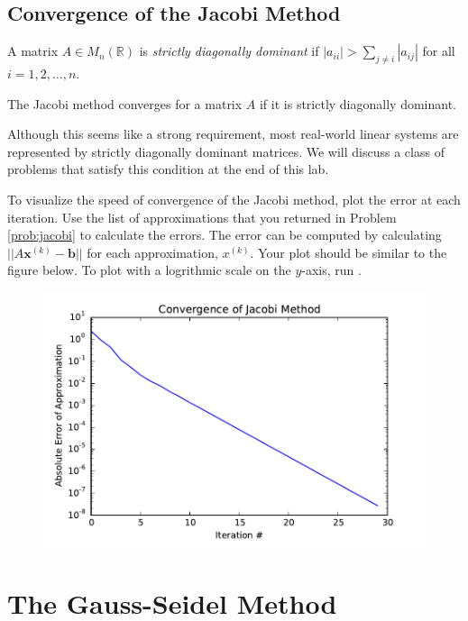 \subsection*{Convergence of the Jacobi Method} %

\begin{definition}
    A matrix $A \in M_n(\mathbb{R})$ is \emph{strictly diagonally dominant} if
    $|a_{ii}| > \sum_{j \neq i} |a_{ij}|$ for all $i = 1,2,\hdots,n$.
\end{definition}

\begin{theorem}
The Jacobi method converges for a matrix $A$ if it is strictly diagonally
dominant.
\end{theorem}

Although this seems like a strong requirement, most real-world linear systems
are represented by strictly diagonally dominant matrices.
We will discuss a class of problems that satisfy this condition at the end of
this lab.

\begin{problem}
To visualize the speed of convergence of the Jacobi method, plot the error at each
iteration. Use the list of approximations that you returned in Problem \ref{prob:jacobi}
to calculate the errors. The error can be computed by calculating
$||A\mathbf{x}^{(k)} - \mathbf{b}||$
for each approximation, $x^{(k)}$. Your plot should be similar to the figure below.
To plot with a logrithmic scale on the $y$-axis, run .

\begin{figure}[H] \label{fig:jacobi_convergence}
\includegraphics[width=.7\textwidth]{jacobi_convergence.pdf}
\label{fig:jacobi_convergence}
\end{figure}
\end{problem}

\section*{The Gauss-Seidel Method} %

